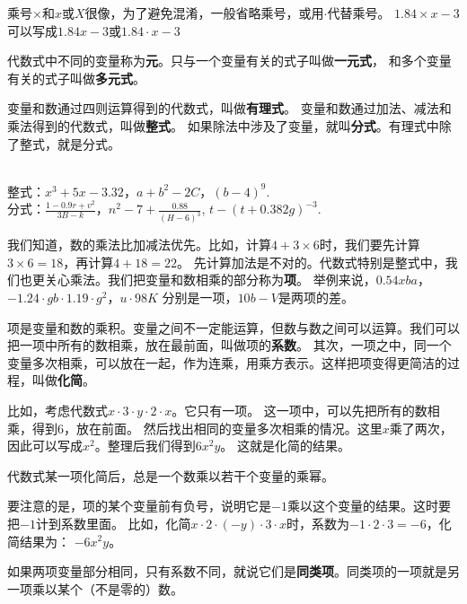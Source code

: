 \documentclass[12pt,UTF8,fontset=none]{ctexbook}
\begin{document}
乘号$\times$和$x$或$X$很像，为了避免混淆，一般省略乘号，或用$\cdot$代替乘号。
$1.84\times x - 3$可以写成$1.84 x - 3$或$1.84\cdot x - 3$

代数式中不同的变量称为\textbf{元}。只与一个变量有关的式子叫做\textbf{一元式}，
和多个变量有关的式子叫做\textbf{多元式}。

变量和数通过四则运算得到的代数式，叫做\textbf{有理式}。
变量和数通过加法、减法和乘法得到的代数式，叫做\textbf{整式}。
如果除法中涉及了变量，就叫\textbf{分式}。有理式中除了整式，就是分式。
\begin{ex}\label{ex:1-1-0}
    \mbox{} \\
    \indent 整式：$x^3 + 5x - 3.32$，$a + b^2 - 2C$，$(b - 4)^9.$ \\
    \indent 分式：$\frac{1 - 0.9r + v^2}{3B - k}$，$n^2 - 7 + \frac{0.88}{(H - 6)^3}$, $t - (t + 0.382g)^{-3}.$\\
\end{ex}

我们知道，数的乘法比加减法优先。比如，计算$4 + 3\times 6$时，我们要先计算$3\times 6 = 18$，再计算$4 + 18 = 22$。
先计算加法是不对的。代数式特别是整式中，我们也更关心乘法。我们把变量和数相乘的部分称为\textbf{项}。
举例来说，$0.54xba$，$-1.24\cdot gb\cdot 1.19 \cdot g^2$，$u\cdot 98K$
分别是一项，$10b - V$是两项的差。

项是变量和数的乘积。变量之间不一定能运算，但数与数之间可以运算。我们可以把一项中所有的数相乘，放在最前面，叫做项的\textbf{系数}。
其次，一项之中，同一个变量多次相乘，可以放在一起，作为连乘，用乘方表示。这样把项变得更简洁的过程，叫做\textbf{化简}。

比如，考虑代数式$x\cdot 3\cdot y \cdot 2\cdot x $。它只有一项。
这一项中，可以先把所有的数相乘，得到$6$，放在前面。
然后找出相同的变量多次相乘的情况。这里$x$乘了两次，因此可以写成$x^2$。整理后我们得到$6x^2y$。
这就是化简的结果。

代数式某一项化简后，总是一个数乘以若干个变量的乘幂。

要注意的是，项的某个变量前有负号，说明它是$-1$乘以这个变量的结果。这时要把$-1$计到系数里面。
比如，化简$x\cdot 2 \cdot (-y)\cdot 3\cdot x$时，系数为$-1\cdot 2\cdot 3=-6$，化简结果为：
$-6x^2y$。

如果两项变量部分相同，只有系数不同，就说它们是\textbf{同类项}。同类项的一项就是另一项乘以某个（不是零的）数。
\end{document}

